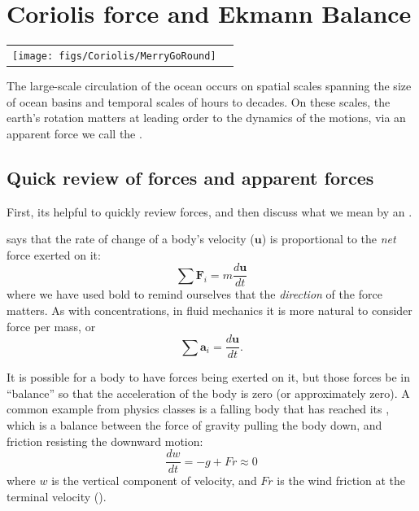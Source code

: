 
\chapter{Coriolis force and Ekmann Balance}
\label{ch:coriolis}

\begin{tabular}{ll}
    \texttt{[image: figs/Coriolis/MerryGoRound]}
\end{tabular}

The large-scale circulation of the ocean occurs on spatial scales spanning the size of ocean basins and temporal scales of hours to decades.  On these scales, the earth's rotation matters at leading order to the dynamics of the motions, via an apparent force we call the .

\section{Quick review of forces and apparent forces}

First, its helpful to quickly review forces, and then discuss what we mean by an .  

 says that the rate of change of a body's velocity ($\mathbf{u}$) is proportional to the \emph{net} force exerted on it:
\begin{equation}
    \sum{\mathbf{F}_i} = m \frac{d \mathbf{u}}{dt}
\end{equation}
where we have used bold to remind ourselves that the \emph{direction} of the force matters.  As with concentrations, in fluid mechanics it is more natural to consider force per mass, or 
\begin{equation}
    \sum{\mathbf{a}_i} = \frac{d \mathbf{u}}{dt}.
\end{equation}

It is possible for a body to have forces being exerted on it, but those forces be in ``balance'' so that the acceleration of the body is zero (or approximately zero).  A common example from physics classes is a falling body that has reached its , which is a balance between the force of gravity pulling the body down, and friction resisting the downward motion:
\begin{equation}
    \frac{dw}{dt} = -g + Fr \approx 0
\end{equation}
where $w$ is the vertical component of velocity, and $Fr$ is the wind friction at the terminal velocity ().  

